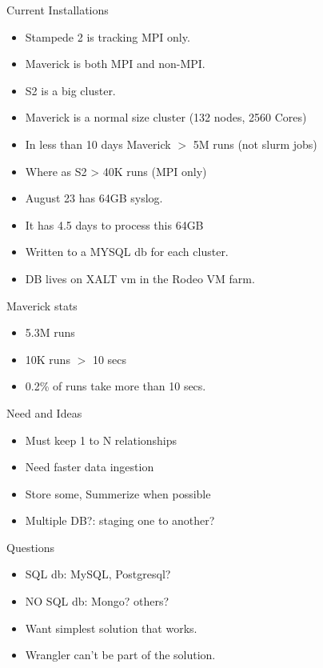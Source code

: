 \documentclass{beamer}
\begin{document}
\begin{frame}{Current Installations}
  \begin{itemize}
    \item Stampede 2 is tracking MPI only.
    \item Maverick is both MPI and non-MPI.
    \item S2 is a big cluster.
    \item Maverick is a normal size cluster (132 nodes, 2560 Cores)
    \item In less than 10 days Maverick $>$ 5M runs (not slurm jobs)
    \item Where as S2 > 40K runs (MPI only)
    \item August 23 has 64GB syslog. 
    \item It has 4.5 days to process this 64GB
    \item Written to a MYSQL db for each cluster.
    \item DB lives on XALT vm in the Rodeo VM farm.
  \end{itemize}
\end{frame}

\begin{frame}{Maverick stats}
  \begin{itemize}
    \item 5.3M runs
    \item 10K runs $>$ 10 secs
    \item 0.2\% of runs take more than 10 secs.
  \end{itemize}
\end{frame}

\begin{frame}{Need and Ideas}
  \begin{itemize}
    \item Must keep 1 to N relationships
    \item Need faster data ingestion
    \item Store some, Summerize when possible
    \item Multiple DB?: staging one to another?
  \end{itemize}
\end{frame}

\begin{frame}{Questions}
  \begin{itemize}
    \item SQL db: MySQL, Postgresql?
    \item NO SQL db: Mongo? others?
    \item Want simplest solution that works.
    \item Wrangler can't be part of the solution.
  \end{itemize}
\end{frame}
\end{document}
